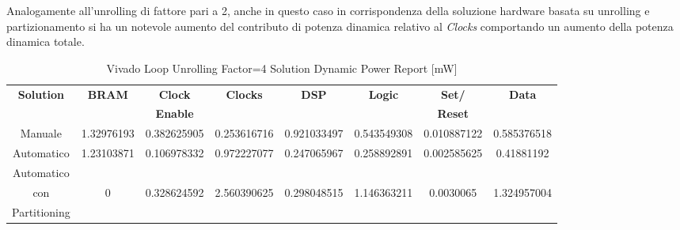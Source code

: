Analogamente all'unrolling di fattore pari a 2, anche in questo caso in corrispondenza della soluzione hardware basata su unrolling e partizionamento si ha un notevole aumento del contributo di potenza dinamica relativo al \textit{Clocks} comportando un aumento della potenza dinamica totale. 

\begin{table}[H]
    \centering
    \begin{tabular}{|c|c|c|c|c|c|c|c|}
        \hline
        \textbf{Solution} & \textbf{BRAM} & \textbf{Clock} & \textbf{Clocks} & \textbf{DSP} & \textbf{Logic} & \textbf{Set/}& \textbf{Data} \\
        & & \textbf{Enable} & & & & \textbf{Reset} & \\
        \hline
        Manuale & 1.32976193 & 0.382625905 & 0.253616716 & 0.921033497 & 0.543549308 & 0.010887122 & 0.585376518 \\
        \hline
        Automatico & 1.23103871 & 0.106978332 & 0.972227077 & 0.247065967 & 0.258892891 & 0.002585625 & 0.41881192 \\
        \hline
        Automatico & & & & & & & \\
        con & 0 & 0.328624592 & 2.560390625 & 0.298048515 & 1.146363211 & 0.0030065 & 1.324957004 \\
        Partitioning & & & & & & & \\
        \hline
    \end{tabular}
    \caption{Vivado Loop Unrolling Factor=4 Solution Dynamic Power Report [mW]}
    \label{tab:vivado-loop-unrolling-factor4-solution-dynamic-power-reproot}
\end{table}

